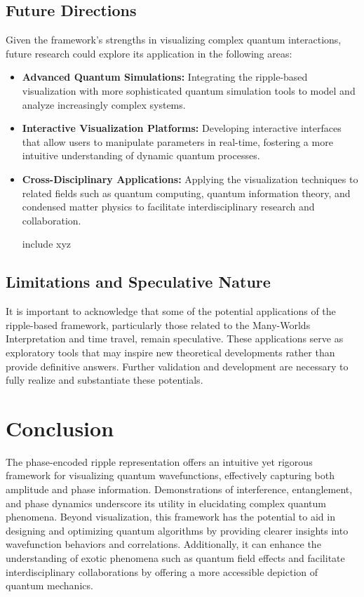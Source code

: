 \documentclass[12pt]{article}
\begin{document}
\subsection{Future Directions}

Given the framework's strengths in visualizing complex quantum interactions, future research could explore its application in the following areas:
\begin{itemize}
    \item \textbf{Advanced Quantum Simulations:} Integrating the ripple-based visualization with more sophisticated quantum simulation tools to model and analyze increasingly complex systems.
    \item \textbf{Interactive Visualization Platforms:} Developing interactive interfaces that allow users to manipulate parameters in real-time, fostering a more intuitive understanding of dynamic quantum processes.
    \item \textbf{Cross-Disciplinary Applications:} Applying the visualization techniques to related fields such as quantum computing, quantum information theory, and condensed matter physics to facilitate interdisciplinary research and collaboration.
    \item [include xyz]
\end{itemize}

\subsection{Limitations and Speculative Nature}

It is important to acknowledge that some of the potential applications of the ripple-based framework, particularly those related to the Many-Worlds Interpretation and time travel, remain speculative. These applications serve as exploratory tools that may inspire new theoretical developments rather than provide definitive answers. Further validation and development are necessary to fully realize and substantiate these potentials.

\section{Conclusion}
The phase-encoded ripple representation offers an intuitive yet rigorous framework for visualizing quantum wavefunctions, effectively capturing both amplitude and phase information. Demonstrations of interference, entanglement, and phase dynamics underscore its utility in elucidating complex quantum phenomena. Beyond visualization, this framework has the potential to aid in designing and optimizing quantum algorithms by providing clearer insights into wavefunction behaviors and correlations. Additionally, it can enhance the understanding of exotic phenomena such as quantum field effects and facilitate interdisciplinary collaborations by offering a more accessible depiction of quantum mechanics.
\end{document}
